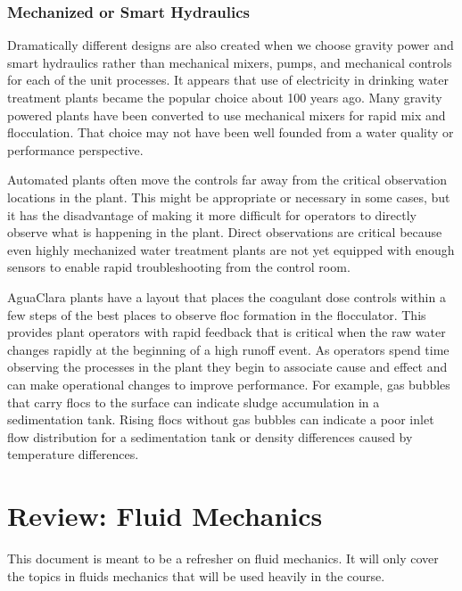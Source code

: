 \documentclass[letterpaper,10pt,english]{sphinxmanual}
\begin{document}
\subsection{Mechanized or Smart Hydraulics}
\label{\detokenize{Introduction/Introduction:mechanized-or-smart-hydraulics}}
Dramatically different designs are also created when we choose gravity power and smart hydraulics rather than mechanical mixers, pumps, and mechanical controls for each of the unit processes. It appears that use of electricity in drinking water treatment plants became the popular choice about 100 years ago. Many gravity powered plants have been converted to use mechanical mixers for rapid mix and flocculation. That choice may not have been well founded from a water quality or performance perspective.

Automated plants often move the controls far away from the critical observation locations in the plant. This might be appropriate or necessary in some cases, but it has the disadvantage of making it more difficult for operators to directly observe what is happening in the plant. Direct observations are critical because even highly mechanized water treatment plants are not yet equipped with enough sensors to enable rapid troubleshooting from the control room.

AguaClara plants have a layout that places the coagulant dose controls within a few steps of the best places to observe floc formation in the flocculator. This provides plant operators with rapid feedback that is critical when the raw water changes rapidly at the beginning of a high runoff event. As operators spend time observing the processes in the plant they begin to associate cause and effect and can make operational changes to improve performance. For example, gas bubbles that carry flocs to the surface can indicate sludge accumulation in a sedimentation tank. Rising flocs without gas bubbles can indicate a poor inlet flow distribution for a sedimentation tank or density differences caused by temperature differences.


\chapter{Review: Fluid Mechanics}
\label{\detokenize{Review/Review_Fluid_Mechanics:review-fluid-mechanics}}\label{\detokenize{Review/Review_Fluid_Mechanics:title-review-fluid-mechanics}}\label{\detokenize{Review/Review_Fluid_Mechanics::doc}}
This document is meant to be a refresher on fluid mechanics. It will only cover the topics in fluids mechanics that will be used heavily in the course.
\end{document}
